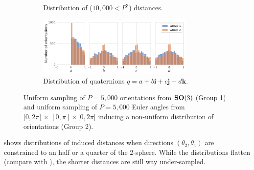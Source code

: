 \begin{figure}[ht!]
\begin{subfigure}[b]{0.36\linewidth}
        \caption{Distribution of ($10,000<P^2$) distances.}%
        \label{fig:orientation-sampling:distances}
    \end{subfigure}
    \hspace{4em}
    \begin{subfigure}[b]{0.46\linewidth}
        \centering
        \includegraphics[height=8em]{figures/uniform_quaternions_vs_angles_q.pdf}
        \caption{Distribution of quaternions $q = a + b\boldsymbol{i} + c\boldsymbol{j} + d\boldsymbol{k}$.}
    \end{subfigure}
    \caption{%
        Uniform sampling of $P=5,000$ orientations from $\mathrm{\mathbf{SO}}(3)$ (Group 1) and uniform sampling of $P=5,000$ Euler angles from $[0,2\pi[ \, \times \, [0,\pi] \times [0,2\pi[$ inducing a non-uniform distribution of orientations (Group 2).
    }\label{fig:orientation-sampling}
\end{figure}

 shows distributions of induced distances when directions $(\theta_2, \theta_1)$ are constrained to an half or a quarter of the 2-sphere.
While the distributions flatten (compare with ), the shorter distances are still way under-sampled.

